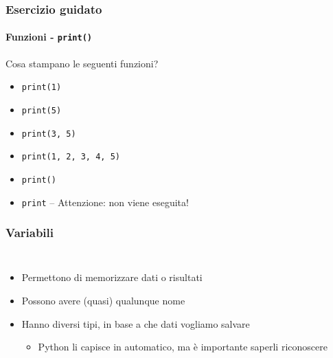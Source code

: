 \begin{exerciseframe}
    \frametitle{Esercizio guidato}
    \framesubtitle{Funzioni - \texttt{print()}}

    Cosa stampano le seguenti funzioni?
    \begin{itemize}
        \item \texttt{print(1)}\pause
        \item \texttt{print(5)}\pause
        \item \texttt{print(3, 5)}\pause
        \item \texttt{print(1, 2, 3, 4, 5)}\pause
        \item \texttt{print()}\pause
        \item \texttt{print}\pause{} -- Attenzione: non viene eseguita!
    \end{itemize}
\end{exerciseframe}

\begin{contentframe}
    \frametitle{Variabili}

    \begin{columns}
        \begin{itemize}
            \item Permettono di memorizzare dati o risultati

            \bigskip
            \item Possono avere (quasi) qualunque nome
            
            \bigskip
            \item Hanno diversi tipi, in base a che dati vogliamo salvare
            \begin{itemize}
                \item Python li capisce in automatico, ma è importante saperli riconoscere
            \end{itemize}
        \end{itemize}
        
        \centering
    \end{columns}
\end{contentframe}

